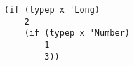 \begin{lstlisting}[style=reclojureClojure]
(if (typep x 'Long)
    2
    (if (typep x 'Number)
        1
        3))
\end{lstlisting}
